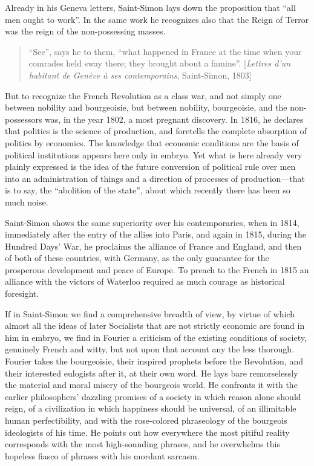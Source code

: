 Already in his Geneva letters, Saint-Simon lays down the proposition that ``all
men ought to work''. In the same work he recognizes also that the Reign of
Terror was the reign of the non-possessing masses.

\begin{quote}
  ``See'', says he to them, ``what happened in France at the time when your
  comrades held sway there; they brought about a famine''. [\emph{Lettres d’un
  habitant de Genève à ses contemporains}, Saint-Simon, 1803]
\end{quote}

But to recognize the French Revolution as a class war, and not simply one
between nobility and bourgeoisie, but between nobility, bourgeoisie, and the
non-possessors was, in the year 1802, a most pregnant discovery. In 1816, he
declares that politics is the science of production, and foretells the complete
absorption of politics by economics. The knowledge that economic conditions are
the basis of political institutions appears here only in embryo. Yet what is
here already very plainly expressed is the idea of the future conversion of
political rule over men into an administration of things and a direction of
processes of production---that is to say, the ``abolition of the state'', about
which recently there has been so much noise.

Saint-Simon shows the same superiority over his contemporaries, when in 1814,
immediately after the entry of the allies into Paris, and again in 1815, during
the Hundred Days' War, he proclaims the alliance of France and England, and then
of both of these countries, with Germany, as the only guarantee for the
prosperous development and peace of Europe. To preach to the French in 1815 an
alliance with the victors of Waterloo required as much courage as historical
foresight.

If in Saint-Simon we find a comprehensive breadth of view, by virtue of which
almost all the ideas of later Socialists that are not strictly economic are
found in him in embryo, we find in Fourier a criticism of the existing
conditions of society, genuinely French and witty, but not upon that account any
the less thorough. Fourier takes the bourgeoisie, their inspired prophets before
the Revolution, and their interested eulogists after it, at their own word. He
lays bare remorselessly the material and moral misery of the bourgeois world. He
confronts it with the earlier philosophers' dazzling promises of a society in
which reason alone should reign, of a civilization in which happiness should be
universal, of an illimitable human perfectibility, and with the rose-colored
phraseology of the bourgeois ideologists of his time. He points out how
everywhere the most pitiful reality corresponds with the most high-sounding
phrases, and he overwhelms this hopeless fiasco of phrases with his mordant
sarcasm.

